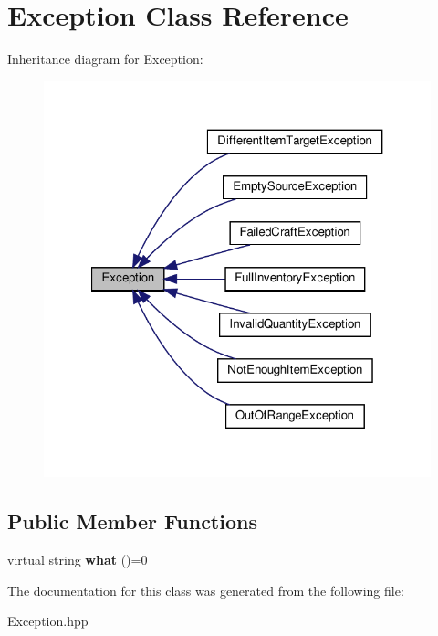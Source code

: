 \hypertarget{classException}{}\section{Exception Class Reference}
\label{classException}


Inheritance diagram for Exception\+:
\nopagebreak
\begin{figure}[H]
\begin{center}
\leavevmode
\includegraphics[width=321pt]{classException__inherit__graph}
\end{center}
\end{figure}
\subsection*{Public Member Functions}
\begin{DoxyCompactItemize}
\item 
\mbox{\label{classException_ab7dc9e19c7ebf82d3e345ffeb4778138}} 
virtual string {\bfseries what} ()=0
\end{DoxyCompactItemize}


The documentation for this class was generated from the following file\+:\begin{DoxyCompactItemize}
\item 
Exception.\+hpp\end{DoxyCompactItemize}
